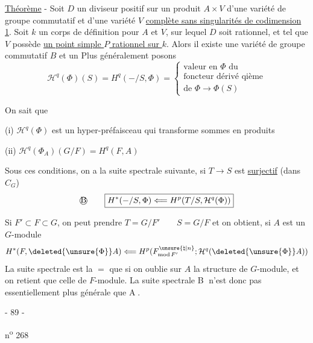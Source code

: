 \uline{Théorème} - Soit $D$ un diviseur positif sur un produit $A\times V$ d'une variété de groupe commutatif et d'une variété $V$ \uline{complète sans singularités de codimension 1}. Soit $k$ un corps de définition pour $A$ et $V$, sur lequel $D$ soit rationnel, et tel que $V$ possède \uline{un point simple $P$ rationnel sur $k$}. Alors il existe une variété de groupe commutatif $B$ et un
Plus généralement  posons
\[
\mathcal H^q(\Phi)(S)=H^q(-/S,\Phi)=\left\{\begin{gathered}\text{valeur en }\Phi\text{ du}\\\text{foncteur dérivé qième}\\\text{de }\Phi\longrightarrow\Phi(S)\end{gathered}\right.
\]

On sait que

(i) $\mathcal H^q(\Phi)$ est un hyper-préfaisceau qui  transforme sommes  en produits

(ii) $\mathcal H^q(\Phi_A)(G/F)=H^q(F,A)$

Sous ces conditions, on a la suite spectrale suivante, si $T\longrightarrow S$ est \uline{surjectif} (dans $C_G$)
\[
\text{\textcircled{B}}\qquad\boxed{H^*(-/S,\Phi)\Longleftarrow H^p(T/S,\mathcal H^q(\Phi))}
\]

Si $F'\subset F\subset G$, on peut prendre $T=G/F'\qquad S=G/F$ et on obtient, si $A$ est un $G$-module
\[
H^*(F,\deleted{\unsure{\Phi}}A)\Longleftarrow H^p(F^{\unsure{\natural|n}}_{\mathrm{mod}\,F'};\mathcal H^q(\deleted{\unsure{\Phi}}A))
\]
La suite spectrale est la $=$ que si on oublie sur $A$ la structure de $G$-module, et on retient que celle de $F$-module. La suite spectrale \textcircled{B} n'est donc pas essentiellement plus générale que \textcircled{A}.

\begin{center}- 89 -\end{center}\hfill n\textsuperscript{o} 268

